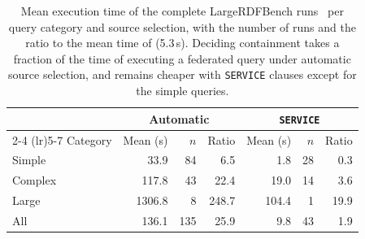 \begin{table}[t]
  \centering
  \small
  \caption{Mean execution time of the complete LargeRDFBench runs~\cite{saleem2018largerdfbench} per query category and source selection, with the number of runs and the ratio to the mean time of \solverName{} (5.3\,s).
Deciding containment takes a fraction of the time of executing a federated query under automatic source selection, and remains cheaper with \texttt{SERVICE} clauses except for the simple queries.}
  \label{fig:largerdfbench_bfc}
  \begin{tabular}{lrrrrrr}
    \toprule
    & \multicolumn{3}{c}{Automatic} & \multicolumn{3}{c}{\texttt{SERVICE}} \\
    \cmidrule(lr){2-4} \cmidrule(lr){5-7}
    Category & Mean (s) & $n$ & Ratio & Mean (s) & $n$ & Ratio \\
    \midrule
    Simple & 33.9 & 84 & 6.5 & 1.8 & 28 & 0.3 \\
    Complex & 117.8 & 43 & 22.4 & 19.0 & 14 & 3.6 \\
    Large & 1306.8 & 8 & 248.7 & 104.4 & 1 & 19.9 \\
    \midrule
    All & 136.1 & 135 & 25.9 & 9.8 & 43 & 1.9 \\
    \bottomrule
  \end{tabular}
\end{table}
